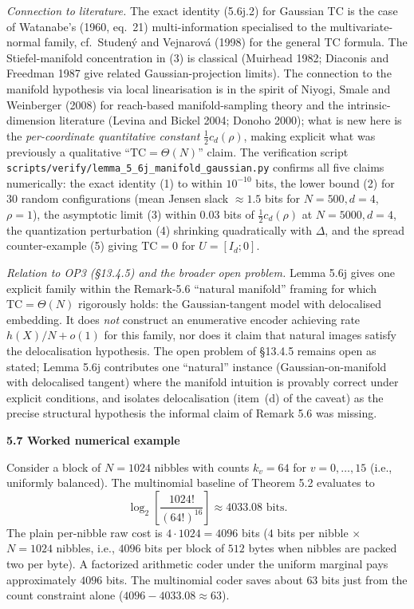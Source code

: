 \documentclass[
]{article}
\begin{document}
\emph{Connection to literature.} The exact identity (5.6j.2) for
Gaussian TC is the case of Watanabe's (1960, eq.~21) multi-information
specialised to the multivariate-normal family, cf.~Studen\'y and
Vejnarov\'a (1998) for the general TC formula. The Stiefel-manifold
concentration in (3) is classical (Muirhead 1982; Diaconis and
Freedman 1987 give related Gaussian-projection limits). The
connection to the manifold hypothesis via local linearisation is in
the spirit of Niyogi, Smale and Weinberger (2008) for reach-based
manifold-sampling theory and the intrinsic-dimension literature
(Levina and Bickel 2004; Donoho 2000); what is new here is the
\emph{per-coordinate quantitative constant} $\tfrac{1}{2} c_d(\rho)$,
making explicit what was previously a qualitative ``$\mathrm{TC} =
\Theta(N)$'' claim. The verification script
\texttt{scripts/verify/lemma\_5\_6j\_manifold\_gaussian.py} confirms
all five claims numerically: the exact identity (1) to within
$10^{-10}$ bits, the lower bound (2) for $30$ random configurations
(mean Jensen slack $\approx 1.5$ bits for $N = 500, d = 4$, $\rho = 1$),
the asymptotic limit (3) within $0.03$ bits of $\tfrac{1}{2} c_d(\rho)$
at $N = 5000, d = 4$, the quantization perturbation (4) shrinking
quadratically with $\Delta$, and the spread counter-example (5)
giving $\mathrm{TC} = 0$ for $U = [I_d; 0]$.

\emph{Relation to OP3 (\S 13.4.5) and the broader open problem.}
Lemma 5.6j gives one explicit family within the Remark-5.6 ``natural
manifold'' framing for which $\mathrm{TC} = \Theta(N)$ rigorously holds:
the Gaussian-tangent model with delocalised embedding. It does
\emph{not} construct an enumerative encoder achieving rate $h(X)/N +
o(1)$ for this family, nor does it claim that natural images satisfy
the delocalisation hypothesis. The open problem of \S 13.4.5 remains
open as stated; Lemma 5.6j contributes one ``natural'' instance
(Gaussian-on-manifold with delocalised tangent) where the manifold
intuition is provably correct under explicit conditions, and isolates
delocalisation (item~(d) of the caveat) as the precise structural
hypothesis the informal claim of Remark 5.6 was missing.

\textbf{5.7 Worked numerical example}

Consider a block of $N = 1024$ nibbles with counts $k_v = 64$ for
$v = 0, \ldots, 15$ (i.e., uniformly balanced). The multinomial
baseline of Theorem 5.2 evaluates to
\[
\log_2 \!\left[\frac{1024!}{(64!)^{16}}\right] \approx 4033.08 \text{ bits.}
\]
The plain per-nibble raw cost is $4 \cdot 1024 = 4096$ bits ($4$
bits per nibble $\times$ $N = 1024$ nibbles, i.e., $4096$ bits per
block of $512$ bytes when nibbles are packed two per byte). A
factorized arithmetic coder under the uniform marginal pays
approximately $4096$ bits. The multinomial coder saves about $63$
bits just from the count constraint alone
($4096 - 4033.08 \approx 63$).
\end{document}
